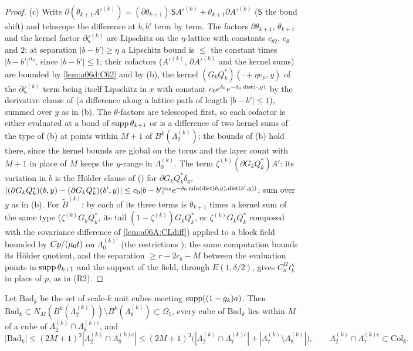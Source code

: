 \begin{proof}
(c) Write $\partial(\theta_{k+1}A'^{(k)})=(\partial\theta_{k+1})\,\mathsf SA'^{(k)}+\theta_{k+1}\partial A'^{(k)}$ ($\mathsf S$ the bond shift) and telescope the difference at $b,b'$ term by term. The factors $\partial\theta_{k+1}$, $\theta_{k+1}$ and the kernel factor $\partial\zeta^{(k)}$ are Lipschitz on the $\eta$-lattice with constants $c_{\theta2}$, $c_\theta$ and $2$; at separation $|b-b'|\ge\eta$ a Lipschitz bound is $\le$ the constant times $|b-b'|^{\alpha_0}$, since $|b-b'|\le1$; their cofactors ($A'^{(k)}$, $\partial A'^{(k)}$ and the kernel sums) are bounded by \cref{lem:a06d:C62} and by (b), the kernel $(G_kQ_k^*)(\cdot+\eta e_\mu,y)$ of the $\partial\zeta^{(k)}$ term being itself Lipschitz in $x$ with constant $c_0e^{\delta_0}e^{-\delta_0\operatorname{dist}(\cdot,y)}$ by the derivative clause of \cite[(2.58)]{Ba2} (a difference along a lattice path of length $|b-b'|\le1$), summed over $y$ as in (b). The $\theta$-factors are telescoped first, so each cofactor is either evaluated at a bond of $\operatorname{supp}\theta_{k+1}$ or is a difference of two kernel sums of the type of (b) at points within $M+1$ of $B^k(\Lambda^{(k)}_2)$; the bounds of (b) hold there, since the kernel bounds are global on the torus and the layer count with $M+1$ in place of $M$ keeps the $y$-range in $\Lambda^{(k)}_0$. The term $\zeta^{(k)}(\partial G_kQ_k^*)A'$: its variation in $b$ is the H\"older clause of \cite[Prop.~2.1, (2.24)]{Ba1} (\cite[Thm., (1.10)]{Ba4}) for $\partial G_kQ_k^*\delta_y$, $|(\partial G_kQ_k^*)(b,y)-(\partial G_kQ_k^*)(b',y)|\le c_0|b-b'|^{\alpha_0}e^{-\delta_0\min(\operatorname{dist}(b,y),\operatorname{dist}(b',y))}$; sum over $y$ as in (b). For $\tilde B^{(k)}$: by \cite[(2.89)]{Ba2} each of its three terms is $\theta_{k+1}$ times a kernel sum of the same type ($\zeta^{(k)}G_kQ_k^*$, its tail $(1-\zeta^{(k)})G_kQ_k^*$, or $\zeta^{(k)}G_kQ_k^*$ composed with the covariance difference of \cref{lem:a06A:CLdiff}) applied to a block field bounded by $Cp/(\mu_0 t)$ on $\Lambda^{(k)'}_0$ (the restrictions \cite[(2.17), (2.55)]{Ba2}); the same computation bounds its H\"older quotient, and the separation $\ge r-2c_b-M$ between the evaluation points in $\operatorname{supp}\theta_{k+1}$ and the support of the field, through $E(1,\delta/2)$, gives $C^H_\kappa t_k^\kappa$ in place of $p$, as in (R2).
\end{proof}

\begin{lemma}\label{lem:a06g:BAD}
Let $\mathrm{Bad}_k$ be the set of scale-$k$ unit cubes meeting $\operatorname{supp}((1-g_k)a)$. Then $\mathrm{Bad}_k\subset N_M(B^k(\Lambda^{(k)}_2))\setminus B^k(\Lambda^{(k)}_8)\subset\Omega_1$, every cube of $\mathrm{Bad}_k$ lies within $M$ of a cube of $\Lambda^{(k)}_2\cap\Lambda^{(k)c}_8$, and
\[
|\mathrm{Bad}_k|\le(2M+1)^3|\Lambda^{(k)}_2\cap\Lambda^{(k)c}_8|\le(2M+1)^3\big(|\Lambda^{(k)}_2\cap\Lambda^{(k)c}_7|+|\Lambda^{(k)}_7\setminus\Lambda^{(k)}_8|\big),\qquad\Lambda^{(k)}_2\cap\Lambda^{(k)c}_7\subset\mathrm{Col}_k.
\]
\end{lemma}

